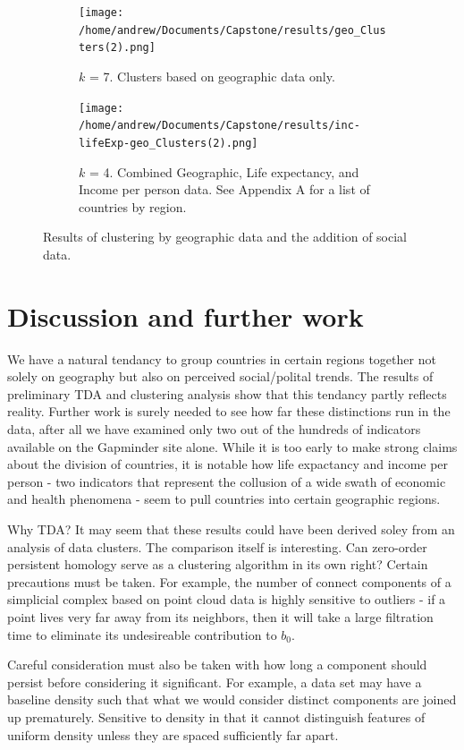 \documentclass[11pt]{amsart}
\theoremstyle{remark}	  \newtheorem*{remark}{Remark}
\numberwithin{equation}{section}
\begin{document}
\begin{figure}
\centering
\begin{subfigure}{.5\textwidth}
  \centering
  \texttt{[image: /home/andrew/Documents/Capstone/results/geo\_Clusters(2).png]}
  \caption{$k$ = 7. Clusters based on geographic data only.}
  \label{fig:sub1}
\end{subfigure}%
\begin{subfigure}{.5\textwidth}
  \centering
  \texttt{[image: /home/andrew/Documents/Capstone/results/inc-lifeExp-geo\_Clusters(2).png]}
  \caption{$k$ = 4. Combined Geographic, Life expectancy, and Income per person data. See Appendix A for a list of countries by region.}
  \label{fig:sub2}
\end{subfigure}
\caption{Results of clustering by geographic data and the addition of social data.}
\label{fig:culster}
\end{figure}


\section{Discussion and further work}

We have a natural tendancy to group countries in certain regions together not solely on geography but also on perceived social/polital trends. The results of preliminary TDA and clustering analysis show that this tendancy partly reflects reality. Further work is surely needed to see how far these distinctions run in the data, after all we have examined only two out of the hundreds of indicators available on the Gapminder site alone. While it is too early to make strong claims about the division of countries, it is notable how life expactancy and income per person - two indicators that represent the collusion of a wide swath of economic and health phenomena - seem to pull countries into certain geographic regions. 

Why TDA? It may seem that these results could have been derived soley from an analysis of data clusters. The comparison itself is interesting. Can zero-order persistent homology serve as a clustering algorithm in its own right? Certain precautions must be taken. For example, the number of connect components of a simplicial complex based on point cloud data is highly sensitive to outliers - if a point lives very far away from its neighbors, then it will take a large filtration time to eliminate its undesireable contribution to $b_0$. 

Careful consideration must also be taken with how long a component should persist before considering it significant. For example, a data set may have a baseline density such that what we would consider distinct components are joined up prematurely. Sensitive to density in that it cannot distinguish features of uniform density unless they are spaced sufficiently far apart.
\end{document}
